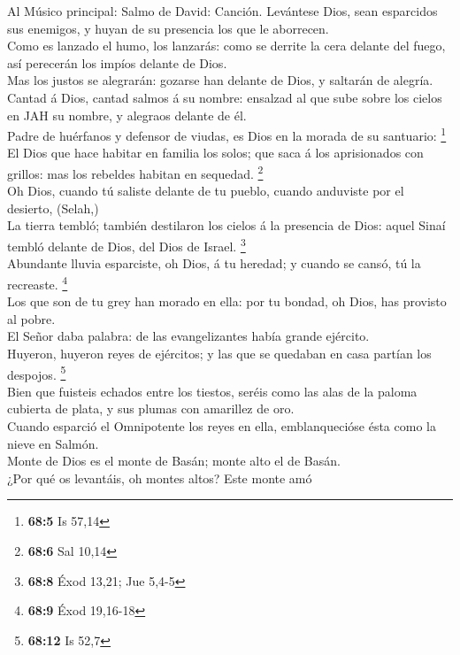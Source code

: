  Al Músico principal: Salmo de David: Canción. Levántese
Dios, sean esparcidos sus enemigos, y huyan de su presencia los que le
aborrecen.\\
 Como es lanzado el humo, los lanzarás: como se derrite la
cera delante del fuego, así perecerán los impíos delante de Dios.\\
 Mas los justos se alegrarán: gozarse han delante de Dios,
y saltarán de alegría.\\
 Cantad á Dios, cantad salmos á su nombre: ensalzad al que
sube sobre los cielos en JAH su nombre, y alegraos delante de él.\\
 Padre de huérfanos y defensor de viudas, es Dios en la
morada de su santuario: \footnote{\textbf{68:5} Is 57,14}\\
 El Dios que hace habitar en familia los solos; que saca á
los aprisionados con grillos: mas los rebeldes habitan en sequedad.
\footnote{\textbf{68:6} Sal 10,14}\\
 Oh Dios, cuando tú saliste delante de tu pueblo, cuando
anduviste por el desierto, (Selah,)\\
 La tierra tembló; también destilaron los cielos á la
presencia de Dios: aquel Sinaí tembló delante de Dios, del Dios de
Israel. \footnote{\textbf{68:8} Éxod 13,21; Jue 5,4-5}\\
 Abundante lluvia esparciste, oh Dios, á tu heredad; y
cuando se cansó, tú la recreaste. \footnote{\textbf{68:9} Éxod 19,16-18}\\
 Los que son de tu grey han morado en ella: por tu
bondad, oh Dios, has provisto al pobre.\\
 El Señor daba palabra: de las evangelizantes había
grande ejército.\\
 Huyeron, huyeron reyes de ejércitos; y las que se
quedaban en casa partían los despojos. \footnote{\textbf{68:12} Is 52,7}\\
 Bien que fuisteis echados entre los tiestos, seréis como
las alas de la paloma cubierta de plata, y sus plumas con amarillez de
oro.\\
 Cuando esparció el Omnipotente los reyes en ella,
emblanquecióse ésta como la nieve en Salmón.\\
 Monte de Dios es el monte de Basán; monte alto el de
Basán.\\
 ¿Por qué os levantáis, oh montes altos? Este monte amó
